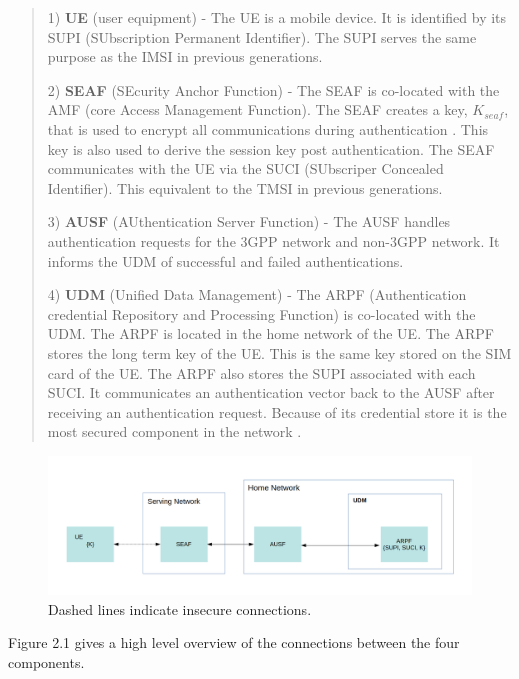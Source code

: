 \documentclass[11pt, pdftex]{article}
\begin{document}
\begin{quote}
1) \textbf{UE} (user equipment) -  The UE is a mobile device.  It is identified by its SUPI (SUbscription Permanent   
Identifier).  The SUPI serves the same purpose as the IMSI in previous generations.

2) \textbf{SEAF} (SEcurity Anchor Function) - The SEAF is co-located with the AMF (core Access Management Function).  The SEAF creates a key, $K_{seaf}$, that is used to encrypt all communications during authentication  \cite{zhang2017overview}.  This key is also used to derive the session key post authentication.  The SEAF communicates with the UE via the SUCI (SUbscriper Concealed Identifier).  This equivalent to the TMSI in previous generations. 

3) \textbf{AUSF} (AUthentication Server Function) -  The AUSF handles authentication requests for the 3GPP network and non-3GPP network.  It informs the UDM of successful and failed authentications.  

4) \textbf{UDM} (Unified Data Management) - The ARPF (Authentication credential Repository and Processing Function) is co-located with the UDM. The ARPF is located in the home network of the UE. The ARPF stores the long term key of the UE.  This is the same key stored on the SIM card of the UE.  The ARPF also stores the SUPI associated with each SUCI.  It communicates an authentication vector back to the AUSF after receiving an authentication request.  Because of its credential store it is the most secured component in the network \cite{cremers2017comprehensive}.

\end{quote}

\graphicspath{ {./images/} }
\begin{figure}[h]
	\begin{center}
		\includegraphics[scale=0.21]{Figure2_1.png}
	\end{center}
	\caption{Dashed lines indicate insecure connections.}
\end{figure}

Figure 2.1 gives a high level overview of the connections between the four components.
\newline
\end{document}
